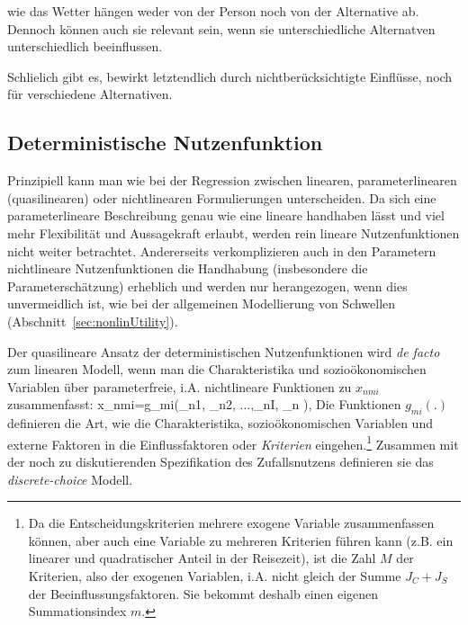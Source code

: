 \item {} wie das Wetter h\"angen weder von der
  Person noch von der Alternative ab. Dennoch k\"onnen auch sie relevant
  sein, wenn sie unterschiedliche Alternatven unterschiedlich
  beeinflussen.

\item Schlie\3lich gibt es, bewirkt letztendlich durch
 nichtber\"ucksichtigte Einfl\"usse, 
noch  f\"ur
  verschiedene Alternativen.
\ei



\subsection{\label{sec:discrV}Deterministische Nutzenfunktion}

Prinzipiell kann man wie bei der Regression zwischen linearen,
parameterlinearen (quasilinearen) oder nichtlinearen Formulierungen unterscheiden. Da
sich eine parameterlineare Beschreibung  genau wie eine lineare
handhaben l\"asst und viel mehr Flexibilit\"at und Aussagekraft
erlaubt, werden rein lineare Nutzenfunktionen nicht weiter
betrachtet. Andererseits verkomplizieren auch in den Parametern
nichtlineare Nutzenfunktionen die Handhabung (insbesondere die
Parametersch\"atzung) erheblich und werden nur herangezogen, wenn dies
unvermeidlich ist, wie bei der allgemeinen Modellierung von Schwellen
(Abschnitt~\ref{sec:nonlinUtility}). 

Der quasilineare Ansatz der deterministischen Nutzenfunktionen 
wird \emph{de facto} zum linearen Modell, wenn
man die Charakteristika und sozio\"okonomischen Variablen \"uber
parameterfreie, i.A. nichtlineare Funktionen zu
 $x_{nmi}$ zu\-sammen\-fasst:
\be
\label{xmni}
x_{nmi}=g_{mi}\left(_{n1}, _{n2}, ...,_{nI}, _n \right),
\ee
Die Funktionen $g_{mi}(.)$  definieren die Art,
wie die Charakteristika, sozio\"okonomischen Variablen und externe Faktoren in die
Einflussfaktoren oder \emph{Kriterien} eingehen.\footnote{Da die
  Entscheidungskriterien mehrere exogene Variable 
zusammenfassen k\"onnen, aber auch eine Variable zu mehreren Kriterien
f\"uhren kann (z.B. ein linearer und quadratischer Anteil in der
Reisezeit), ist die Zahl $M$ der Kriterien, also der exogenen
Variablen,  i.A. nicht gleich der Summe
$J_C+J_S$ der Beeinflussungsfaktoren. Sie bekommt deshalb einen eigenen
Summationsindex $m$.} 
Zusammen mit der
noch zu diskutierenden Spezifikation des Zufallsnutzens definieren sie
das \textit{discrete-choice} Modell. 

